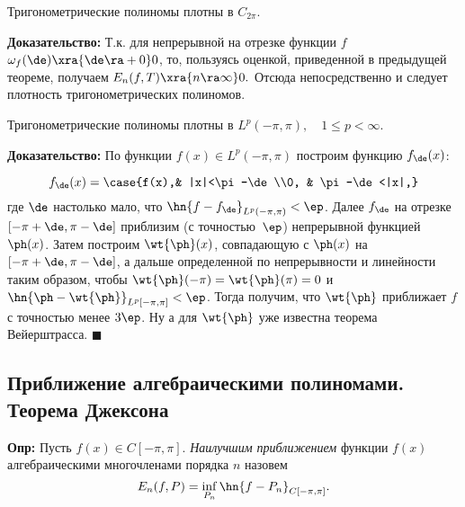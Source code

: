\documentclass[a4paper]{article}
\begin{document}
\begin{theorem}[Вейерштрасс] Тригонометрические полиномы плотны в
$C_{2\pi}.$
\end{theorem}
\textbf{Доказательство:} Т.к. для непрерывной на отрезке функции
$f$ $\omega_f(\de)\xra{\de\ra +0} 0$, то,
пользуясь оценкой, приведенной в предыдущей теореме, получаем
$E_n(f,T)\xra{n\ra\infty} 0.$ Отсюда
непосредственно и следует плотность тригонометрических полиномов.

\begin{theorem} Тригонометрические полиномы плотны в
$L^p(-\pi,\pi),\quad1\le p<\infty$.
\end{theorem}
\textbf{Доказательство:} По функции $f(x)\in L^p(-\pi,\pi)$
построим функцию $f_{\de}(x)$:

\begin{wrapfigure}[8]{l}{140pt}
\end{wrapfigure}

$$f_{\de}(x)=
\case{f(x),& |x|<\pi-\de\\0, & \pi-\de<|x|,}$$
где $\de$ настолько мало, что
$\hn{f-f_{\de}}_{L^p(-\pi,\pi)}<\ep$. Далее $f_{\de}$
на отрезке $[-\pi+\de,\pi-\de]$ приблизим (с
точностью~$\ep$) непрерывной функцией $\ph(x)$. Затем
построим $\wt{\ph}(x)$, совпадающую с $\ph(x)$ на
$[-\pi+\de,\pi-\de]$, а дальше определенной по непрерывности
и линейности таким образом, чтобы
$\wt{\ph}(-\pi)=\wt{\ph}(\pi)=0$ и
$\hn{\ph-\wt{\ph}}_{L^p[-\pi,\pi]}<\ep$. Тогда
получим, что $\wt{\ph}$ приближает $f$ с точностью менее
$3\ep$. Ну а для $\wt{\ph}$ уже известна теорема
Вейерштрасса. $\blacksquare$

\subsection{Приближение алгебраическими полиномами. Теорема Джексона}
\textbf{Опр:} Пусть $f(x)\in C[-\pi,\pi]$. \emph{Наилучшим
приближением} функции $f(x)$ алгебраическими многочленами порядка
$n$ назовем
$$E_n(f,P)=\inf_{P_n}\hn{f-P_n}_{C[-\pi,\pi]}.$$
\end{document}
